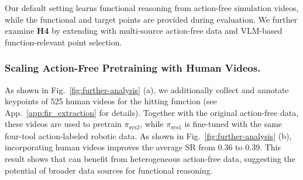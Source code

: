 Our default setting learns functional reasoning from action-free simulation videos, while the functional and target points are provided during evaluation.
We further examine \textbf{H4} by extending \algoname{} with multi-source action-free data and VLM-based function-relevant point selection.

\subsubsection{Scaling Action-Free Pretraining with Human Videos.}
\label{sec:scalability-human-video}
As shown in Fig.~\ref{fig:further-analysis} (a), we additionally collect and annotate keypoints of 525 human videos for the hitting function (see App.~\ref{app:fir_extraction} for details).
Together with the original action-free data, these videos are used to pretrain $\pi_{\mathrm{sys2}}$, while $\pi_{\mathrm{sys1}}$ is fine-tuned with the same four-tool action-labeled robotic data.
As shown in Fig.~\ref{fig:further-analysis} (b), incorporating human videos improves the average SR from $0.36$ to $0.39$.
This result shows that \algoname{} can benefit from heterogeneous action-free data, suggesting the potential of broader data sources for functional reasoning.

